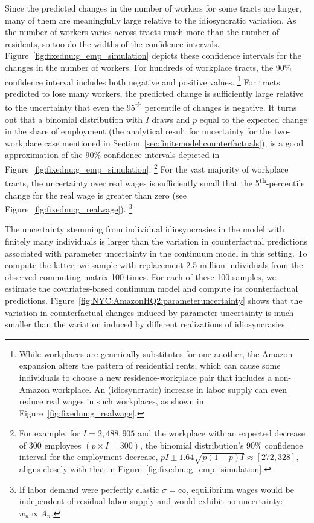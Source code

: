 \documentclass[11pt]{article}
\theoremstyle{definition}
\begin{document}
Since the predicted changes in the number of workers for some tracts are larger,
many of them are meaningfully large relative to the idiosyncratic variation.
As the number of workers varies across tracts much more than the number of residents,
so too do the widths of the confidence intervals.
Figure~\ref{fig:fixednu:g_emp_simulation} depicts these confidence intervals for the changes in the number of workers.
For hundreds of workplace tracts, the 90\% confidence interval includes both negative and positive values.%
\footnote{
	While workplaces are generically substitutes for one another,
	the Amazon expansion alters the pattern of residential rents,
	which can cause some individuals to choose a new residence-workplace pair that includes a non-Amazon workplace.
	An (idiosyncratic) increase in labor supply can even reduce real wages in such workplaces,
	as shown in Figure~\ref{fig:fixednu:g_realwage}.
}
For tracts predicted to lose many workers, the predicted change is sufficiently large relative to the uncertainty that even the 95\textsuperscript{th} percentile of changes is negative.
It turns out that a binomial distribution
with $I$ draws and $p$ equal to the expected change in the share of employment
(the analytical result for uncertainty for the two-workplace case mentioned in Section~\ref{sec:finitemodel:counterfactuals}),
is a good approximation of the 90\% confidence intervals depicted in Figure~\ref{fig:fixednu:g_emp_simulation}.%
\footnote{
	For example, for $I = 2,488,905$ and the workplace with an expected decrease of 300 employees $(p \times I = 300)$,
	the binomial distribution's 90\% confidence interval for the employment decrease,
	$pI \pm 1.64 \sqrt{p(1-p)I}
	\approx [272, 328]$,
	aligns closely with that in Figure~\ref{fig:fixednu:g_emp_simulation}.
}
For the vast majority of workplace tracts,
the uncertainty over real wages is sufficiently small that
the 5\textsuperscript{th}-percentile change for the real wage is greater than zero
(see Figure~\ref{fig:fixednu:g_realwage}).%
\footnote{
	If labor demand were perfectly elastic $\sigma=\infty$,
	equilibrium wages would be independent of residual labor supply and would exhibit no uncertainty:
	$w_n \propto A_n$.
}

The uncertainty stemming from individual idiosyncrasies in the model with finitely many individuals
is larger than the variation in counterfactual predictions associated with
parameter uncertainty in the continuum model in this setting.
To compute the latter,
we sample with replacement 2.5 million individuals from the observed commuting matrix 100 times.
For each of these 100 samples,
we estimate the covariates-based continuum model and compute its counterfactual predictions.
Figure~\ref{fig:NYC:AmazonHQ2:parameteruncertainty} shows that
the variation in counterfactual changes induced by parameter uncertainty
is much smaller than
the variation induced by different realizations of idiosyncrasies.
\end{document}

